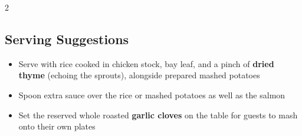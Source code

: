 \documentclass[11pt,letterpaper]{article}
\begin{document}
{\begin{multicols}{2}
\subsection*{Serving Suggestions}
\begin{itemize}
    \item Serve with rice cooked in chicken stock, bay leaf, and a pinch of \textbf{dried thyme} (echoing the sprouts), alongside prepared mashed potatoes
    \item Spoon extra sauce over the rice or mashed potatoes as well as the salmon
    \item Set the reserved whole roasted \textbf{garlic cloves} on the table for guests to mash onto their own plates
\end{itemize}

\end{multicols}
}
\end{document}

